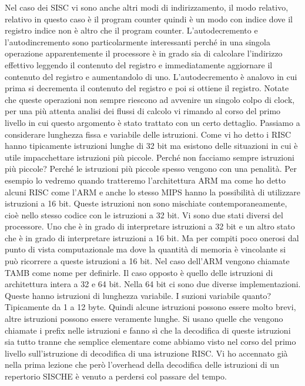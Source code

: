 Nel caso dei SISC vi sono anche altri modi di indirizzamento, il modo relativo, relativo in questo caso è il program counter quindi è un modo con indice dove il registro indice non è altro che il program counter.
L'autodecremento e l'autodincremento sono particolarmente interessanti perché in una singola operazione apparentemente il processore è in grado sia di calcolare l'indirizzo effettivo leggendo il contenuto del registro e immediatamente aggiornare il contenuto del registro e aumentandolo di uno.
L'autodecremento è analovo in cui prima si decrementa il contenuto del registro e poi si ottiene il registro.
Notate che queste operazioni non sempre riescono ad avvenire un singolo colpo di clock, per una più attenta analisi dei flussi di calcolo vi rimando al corso del primo livello in cui questo argomento è stato trattato con un certo dettaglio.
Passiamo a considerare lunghezza fissa e variabile delle istruzioni.
Come vi ho detto i RISC hanno tipicamente istruzioni lunghe di 32 bit ma esistono delle situazioni in cui è utile impacchettare istruzioni più piccole.
Perché non facciamo sempre istruzioni più piccole?
Perché le istruzioni più piccole spesso vengono con una penalità.
Per esempio lo vedremo quando tratteremo l'architettura ARM ma come ho detto alcuni RISC come l'ARM e anche lo stesso MIPS hanno la possibilità di utilizzare istruzioni a 16 bit.
Queste istruzioni non sono mischiate contemporaneamente, cioè nello stesso codice con le istruzioni a 32 bit.
Vi sono due stati diversi del processore.
Uno che è in grado di interpretare istruzioni a 32 bit e un altro stato che è in grado di interpretare istruzioni a 16 bit.
Ma per compiti poco onerosi dal punto di vista computazionale ma dove la quantità di memoria è vincolante si può ricorrere a queste istruzioni a 16 bit.
Nel caso dell'ARM vengono chiamate TAMB come nome per definirle.
Il caso opposto è quello delle istruzioni di architettura intera a 32 e 64 bit.
Nella 64 bit ci sono due diverse implementazioni.
Queste hanno istruzioni di lunghezza variabile.
I suzioni variabile quanto?
Tipicamente da 1 a 12 byte.
Quindi alcune istruzioni possono essere molto brevi, altre istruzioni possono essere veramente lunghe.
Si usano quelle che vengono chiamate i prefix nelle istruzioni e fanno sì che la decodifica di queste istruzioni sia tutto tranne che semplice elementare come abbiamo visto nel corso del primo livello sull'istruzione di decodifica di una istruzione RISC.
Vi ho accennato già nella prima lezione che però l'overhead della decodifica delle istruzioni di un repertorio SISCHE è venuto a perdersi col passare del tempo.
